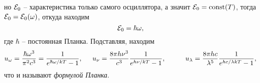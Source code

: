 но $\mathcal E_0$ -- характеристика только самого осциллятора, а значит $\mathcal E_0 = \textnormal{const} (T)$, тогда $\mathcal E_0 = \mathcal E_0(\omega)$, откуда находим
\begin{equation*}
    \mathcal E_0 = \hbar \omega,
\end{equation*}
где $\hbar$ -- постоянная Планка. Подставляя, находим
\begin{equation}
    u_\omega = \frac{\hbar \omega^3}{\pi^2 c^3} = \frac{1}{e^{\hbar \omega /  kT} - 1},
    \hspace{5 mm} 
    u_\nu = \frac{8 \pi h \nu^3}{c^3} \frac{1}{e^{h \nu / kT}-1},
    \hspace{10 mm} 
    u_\lambda = \frac{8 \pi h c}{\lambda^5} \frac{1}{e^{h c / \lambda k T} - 1},
\end{equation}
что и называют \textit{формулой Планка}.



